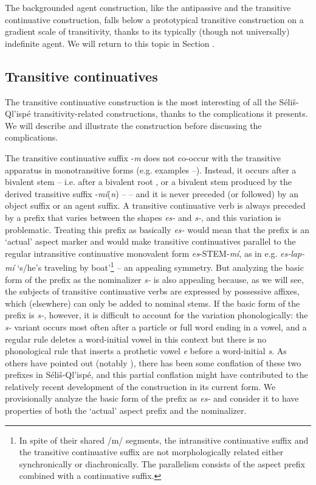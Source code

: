 \documentclass[output=paper,colorlinks,citecolor=brown]{langscibook}
\begin{document}
The backgrounded agent construction, like the antipassive and the
transitive continuative construction, falls below a prototypical
transitive construction on a gradient scale of transitivity, thanks to
its typically (though not universally) indefinite agent.  We will
return to this topic in Section .

\subsection{Transitive continuatives}  %
\label{thomason_section_2.6}

The transitive continuative construction is the most interesting of
all the S\'eli\v{s}-Ql'isp\'e transitivity-related constructions,
thanks to the complications it presents.  We will describe and
illustrate the construction before discussing the complications.

The transitive continuative suffix -\emph{m} does not co-occur with
the transitive apparatus in monotransitive forms (e.g.  examples --).
Instead, it occurs after a bivalent stem -- i.e. after a bivalent root
,  or a bivalent stem produced by the derived transitive suffix
-\emph{m\'i}(\emph{n}) -- -- and it is never preceded (or
followed) by an object suffix or an agent suffix.  A transitive
continuative verb is always preceded by a prefix that varies between
the shapes \emph{es-} and \emph{s-}, and this variation is
problematic.  Treating this prefix as basically \emph{es-} would mean
that the prefix is an `actual' aspect marker and would make transitive
continuatives parallel to the regular intransitive continuative
monovalent form \emph{es}-STEM-\emph{m\'i}, as in
e.g. \emph{es-lap-m\'i} `s/he's traveling by boat'\footnote{In spite
of their shared /m/ segments, the intransitive continuative suffix and
the transitive continuative suffix are not morphologically related
either synchronically or diachronically. The parallelism consists of
the aspect prefix combined with a continuative suffix.  } -- an
appealing symmetry.  But analyzing the basic form of the prefix as the
nominalizer \emph{s-} is also appealing because, as we will see, the
subjects of transitive continuative verbs are expressed by possessive
affixes, which (elsewhere) can only be added to nominal stems.  If the
basic form of the prefix is \emph{s-}, however, it is difficult to
account for the variation phonologically: the \emph{s-} variant occurs
most often after a particle or full word ending in a vowel, and a
regular rule deletes a word-initial vowel in this context but there
is no phonological rule that inserts a prothetic vowel \emph{e} before
a word-initial \emph{s}.  As others have pointed out (notably
\citet{Kroeber:1999}), there has been some conflation of these two
prefixes in S\'eli\v{s}-Ql'isp\'e, and this partial conflation might
have contributed to the relatively recent development of the
construction in its current form.  We provisionally analyze the basic
form of the prefix as \emph{es-} and consider it to have properties of
both the `actual' aspect prefix and the nominalizer.
\end{document}
